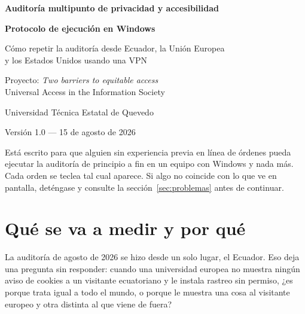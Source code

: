 \documentclass[11pt,a4paper]{article}
\begin{document}
\begin{titlepage}
	\centering
	\vspace*{2.5cm}
	{\Large\bfseries\color{azul} Auditoría multipunto de privacidad y accesibilidad\par}
	\vspace{0.6cm}
	{\LARGE\bfseries Protocolo de ejecución en Windows\par}
	\vspace{1.2cm}
	{\large Cómo repetir la auditoría desde Ecuador, la Unión Europea\\ y los Estados Unidos usando una VPN\par}
	\vspace{2.0cm}
	{\large Proyecto: \textit{Two barriers to equitable access}\\ Universal Access in the Information Society\par}
	\vspace{1.0cm}
	{Universidad Técnica Estatal de Quevedo\par}
	\vspace{2.5cm}
	{\normalsize Versión 1.0 — 15 de agosto de 2026\par}
	\vfill
	\begin{nota}
		Está escrito para que alguien sin experiencia previa en línea de órdenes pueda ejecutar la auditoría de principio a fin en un equipo con Windows y nada más. Cada orden se teclea tal cual aparece. Si algo no coincide con lo que ve en pantalla, deténgase y consulte la sección~\ref{sec:problemas} antes de continuar.
	\end{nota}
\end{titlepage}

\tableofcontents
\newpage

\section{Qué se va a medir y por qué}\label{sec:que}

La auditoría de agosto de 2026 se hizo desde un solo lugar, el Ecuador. Eso deja una pregunta sin responder: cuando una universidad europea no muestra ningún aviso de cookies a un visitante ecuatoriano y le instala rastreo sin permiso, ¿es porque trata igual a todo el mundo, o porque le muestra una cosa al visitante europeo y otra distinta al que viene de fuera?
\end{document}

